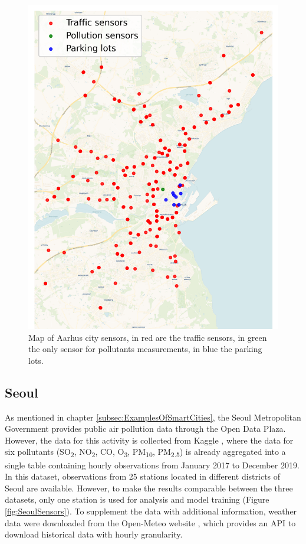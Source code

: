 \newpage

\begin{figure}[h]
    \centering
    \includegraphics[width=0.5\linewidth]{images/aarhussensors.png}
    \caption{Map of Aarhus city sensors, in red are the traffic sensors, in green the only sensor for pollutants measurements, in blue the parking lots.}
    \label{fig:aarhus-sensors}
\end{figure}


\subsection{Seoul}
As mentioned in chapter \ref{subsec:ExamplesOfSmartCities}, the Seoul Metropolitan Government provides public air pollution data through the Open Data Plaza. However, the data for this activity is collected from Kaggle \cite{kaggleSeoul}, where the data for six pollutants (SO\textsubscript{2}, NO\textsubscript{2}, CO, O\textsubscript{3}, PM\textsubscript{10}, PM\textsubscript{2.5}) is already aggregated into a single table containing hourly observations from January 2017 to December 2019. 
In this dataset, observations from 25 stations located in different districts of Seoul are available. However, to make the results comparable between the three datasets, only one station is used for analysis and model training (Figure \ref{fig:SeoulSensors}).
To supplement the data with additional information, weather data were downloaded from the Open-Meteo website \cite{openMeteo}, which provides an API to download historical data with hourly granularity. 

